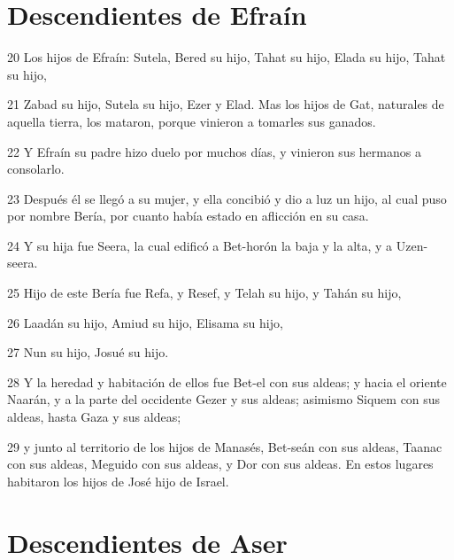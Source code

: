 \section*{Descendientes de Efraín}

\par 20 Los hijos de Efraín: Sutela, Bered su hijo, Tahat su hijo, Elada su hijo, Tahat su hijo,
\par 21 Zabad su hijo, Sutela su hijo, Ezer y Elad. Mas los hijos de Gat, naturales de aquella tierra, los mataron, porque vinieron a tomarles sus ganados.
\par 22 Y Efraín su padre hizo duelo por muchos días, y vinieron sus hermanos a consolarlo.
\par 23 Después él se llegó a su mujer, y ella concibió y dio a luz un hijo, al cual puso por nombre Bería, por cuanto había estado en aflicción en su casa.
\par 24 Y su hija fue Seera, la cual edificó a Bet-horón la baja y la alta, y a Uzen-seera.
\par 25 Hijo de este Bería fue Refa, y Resef, y Telah su hijo, y Tahán su hijo,
\par 26 Laadán su hijo, Amiud su hijo, Elisama su hijo,
\par 27 Nun su hijo, Josué su hijo.
\par 28 Y la heredad y habitación de ellos fue Bet-el con sus aldeas; y hacia el oriente Naarán, y a la parte del occidente Gezer y sus aldeas; asimismo Siquem con sus aldeas, hasta Gaza y sus aldeas;
\par 29 y junto al territorio de los hijos de Manasés, Bet-seán con sus aldeas, Taanac con sus aldeas, Meguido con sus aldeas, y Dor con sus aldeas. En estos lugares habitaron los hijos de José hijo de Israel.

\section*{Descendientes de Aser}

